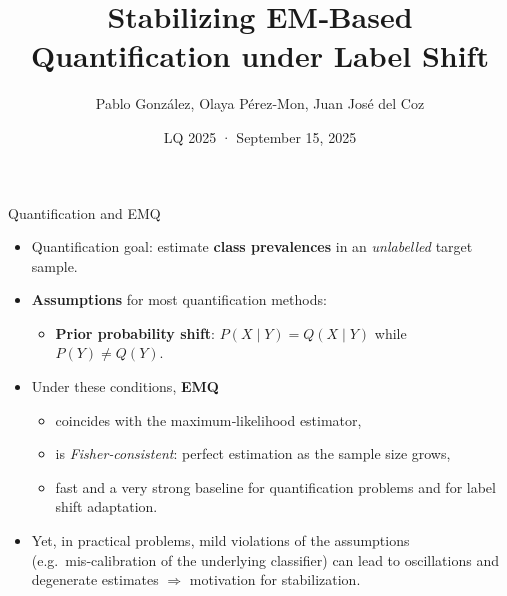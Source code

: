 \documentclass[aspectratio=169]{beamer}
\title[Stabilizing EM‑Based Quantification]{Stabilizing EM‑Based Quantification under Label Shift}
\author{Pablo González, Olaya Pérez-Mon, Juan José del Coz}
\institute[AI Center, Uni. Oviedo]{Artificial Intelligence Center\\University of Oviedo}
\date{LQ 2025 · September 15, 2025}
\begin{document}
\begin{frame}
  \titlepage
\end{frame}

\begin{frame}{Quantification and EMQ}
  \begin{itemize}
    \item \alert{Quantification goal}: estimate \textbf{class prevalences} in an \emph{unlabelled} target sample.
    \item \textbf{Assumptions} for most quantification methods:
          \begin{itemize}
            \item \textbf{Prior probability shift}: $P(X\mid Y)=Q(X\mid Y)$ while $P(Y)\neq Q(Y)$.
          \end{itemize}
    \item Under these conditions, \textbf{EMQ}
          \begin{itemize}
            \item coincides with the maximum‑likelihood estimator,
            \item is \emph{Fisher‑consistent}: perfect estimation as the sample size grows,
            \item fast and a very strong baseline for quantification problems and for label shift adaptation.
          \end{itemize}
    \item Yet, in practical problems, mild violations of the assumptions (e.g.\ mis‑calibration of the underlying classifier) can lead to oscillations and degenerate estimates $\Rightarrow$ motivation for stabilization.
  \end{itemize}
\end{frame}
\end{document}
